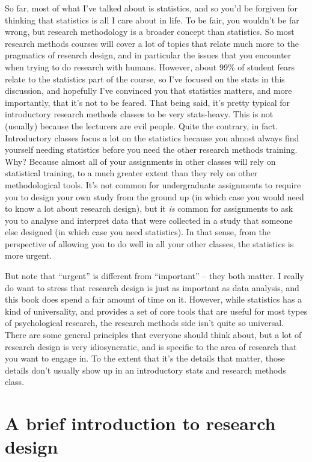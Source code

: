 \documentclass[
  a4paper,
]{book}
\begin{document}
So far, most of what I've talked about is statistics, and so you'd be
forgiven for thinking that statistics is all I care about in life. To be
fair, you wouldn't be far wrong, but research methodology is a broader
concept than statistics. So most research methods courses will cover a
lot of topics that relate much more to the pragmatics of research
design, and in particular the issues that you encounter when trying to
do research with humans. However, about 99\% of student fears relate to
the statistics part of the course, so I've focused on the stats in this
discussion, and hopefully I've convinced you that statistics matters,
and more importantly, that it's not to be feared. That being said, it's
pretty typical for introductory research methods classes to be very
stats-heavy. This is not (usually) because the lecturers are evil
people. Quite the contrary, in fact. Introductory classes focus a lot on
the statistics because you almost always find yourself needing
statistics before you need the other research methods training. Why?
Because almost all of your assignments in other classes will rely on
statistical training, to a much greater extent than they rely on other
methodological tools. It's not common for undergraduate assignments to
require you to design your own study from the ground up (in which case
you would need to know a lot about research design), but it \emph{is}
common for assignments to ask you to analyse and interpret data that
were collected in a study that someone else designed (in which case you
need statistics). In that sense, from the perspective of allowing you to
do well in all your other classes, the statistics is more urgent.

But note that ``urgent'' is different from ``important'' -- they both
matter. I really do want to stress that research design is just as
important as data analysis, and this book does spend a fair amount of
time on it. However, while statistics has a kind of universality, and
provides a set of core tools that are useful for most types of
psychological research, the research methods side isn't quite so
universal. There are some general principles that everyone should think
about, but a lot of research design is very idiosyncratic, and is
specific to the area of research that you want to engage in. To the
extent that it's the details that matter, those details don't usually
show up in an introductory stats and research methods class.

\hypertarget{sec-A-brief-introduction-to-research-design}{%
\chapter{A brief introduction to research
design}\label{sec-A-brief-introduction-to-research-design}}
\end{document}
